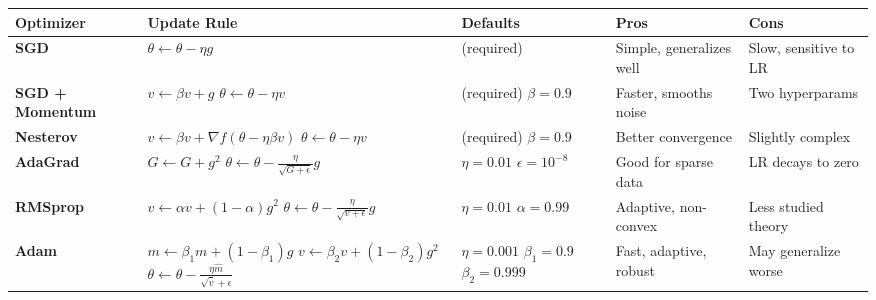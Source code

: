 \documentclass[../main.tex]{subfiles}
\begin{document}
\begin{table}[htbp]
\centering
\scriptsize
\renewcommand{\arraystretch}{1.3}
\begin{tabularx}{\textwidth}{@{}l>{\raggedright\arraybackslash}p{2.8cm}>{\raggedright\arraybackslash}p{1.8cm}>{\raggedright\arraybackslash}p{2.2cm}>{\raggedright\arraybackslash}p{2.2cm}@{}}
\toprule
\textbf{Optimizer} & \textbf{Update Rule} & \textbf{Defaults} & \textbf{Pros} & \textbf{Cons} \\
\midrule

\textbf{SGD} &
$\theta \leftarrow \theta - \eta g$ &
(required) &
Simple, generalizes well &
Slow, sensitive to LR \\[0.3cm]

\textbf{SGD + Momentum} &
$v \leftarrow \beta v + g$ \newline
$\theta \leftarrow \theta - \eta v$ &
(required) \newline $\beta = 0.9$ &
Faster, smooths noise &
Two hyperparams \\[0.3cm]

\textbf{Nesterov} &
$v \leftarrow \beta v + \nabla f(\theta - \eta\beta v)$ \newline
$\theta \leftarrow \theta - \eta v$ &
(required) \newline $\beta = 0.9$ &
Better convergence &
Slightly complex \\[0.3cm]

\textbf{AdaGrad} &
$G \leftarrow G + g^2$ \newline
$\theta \leftarrow \theta - \frac{\eta}{\sqrt{G + \epsilon}} g$ &
$\eta = 0.01$ \newline $\epsilon = 10^{-8}$ &
Good for sparse data &
LR decays to zero \\[0.3cm]

\textbf{RMSprop} &
$v \leftarrow \alpha v + (1-\alpha) g^2$ \newline
$\theta \leftarrow \theta - \frac{\eta}{\sqrt{v + \epsilon}} g$ &
$\eta = 0.01$ \newline $\alpha = 0.99$ &
Adaptive, non-convex &
Less studied theory \\[0.3cm]

\textbf{Adam} &
$m \leftarrow \beta_1 m + (1-\beta_1) g$ \newline
$v \leftarrow \beta_2 v + (1-\beta_2) g^2$ \newline
$\theta \leftarrow \theta - \frac{\eta \hat{m}}{\sqrt{\hat{v}} + \epsilon}$ &
$\eta = 0.001$ \newline $\beta_1 = 0.9$ \newline $\beta_2 = 0.999$ &
Fast, adaptive, robust &
May generalize worse \\[0.3cm]


\end{tabularx}
\end{table}
\end{document}
